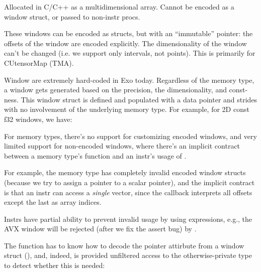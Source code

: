 \filbreak
{} Allocated in C/C++ as a multidimensional array.
Cannot be encoded as a window struct, or passed to non-instr procs.



\filbreak
{}
These windows can be encoded as structs, but with an ``immutable'' pointer: the offsets of the window are encoded explicitly.
The dimensionality of the window can't be changed (i.e. we support only intervals, not points).
This is primarily for CUtensorMap (TMA).



\filbreak
{}

Window are extremely hard-coded in Exo today.
Regardless of the memory type, a window gets generated based on the precision, the dimensionality, and const-ness.
This window struct is defined and populated with a data pointer and strides with no involvement of the underlying memory type. For example, for 2D const f32 windows, we have:



\filbreak
For memory types, there's no support for customizing encoded windows, and very limited support for non-encoded windows, where there's an implicit contract between a memory type's  function and an instr's usage of  .

\filbreak
For example, the  memory type has completely invalid encoded window structs (because we try to assign a  pointer to a scalar  pointer), and the implicit  contract is that an instr can access a \textit{single}  vector, since the  callback interprets all offsets except the last as array indices.



\filbreak
Instrs have partial ability to prevent invalid usage by using  expressions, e.g., the AVX window  will be rejected (after we fix the assert bug) by .

\filbreak
The  function has to know how to decode the pointer attirbute from a window struct (), and, indeed, is provided unfiltered access to the otherwise-private  type to detect whether this is needed:

